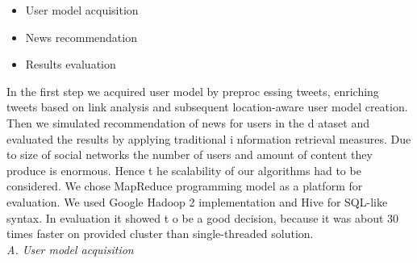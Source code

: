\documentclass[conference]{IEEEtran}
\begin{document}
\begin{itemize}
\item{User model acquisition}
\item{News recommendation}
\item{Results evaluation}
\end{itemize}

In the first step we acquired user model by preproc
essing 
tweets,   enriching   tweets   based   on   link   analysis   and
subsequent  location-aware  user  model  creation.  Then
  we 
simulated  recommendation  of  news  for  users  in  the  d
ataset 
and evaluated the results by applying traditional i
nformation 
retrieval measures. 
Due  to  size  of  social  networks  the  number  of  users 
and 
amount  of  content  they  produce  is  enormous.  Hence  t
he 
scalability of our algorithms had to be considered.
 We chose 
MapReduce    programming    model    as    a    platform    for evaluation.  We  used  Google  Hadoop
2
 implementation  and 
Hive  for  SQL-like  syntax.  In  evaluation  it  showed  t
o  be  a 
good  decision,  because  it  was  about  30  times  faster
  on 
provided cluster than single-threaded solution. \\

\textit{A.  User model acquisition}\\
\end{document}
